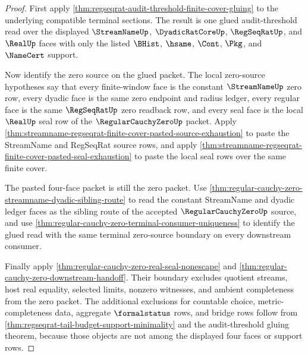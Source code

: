 \begin{proof}
First apply \autoref{thm:regseqrat-audit-threshold-finite-cover-gluing} to the underlying compatible terminal sections. The result is one glued audit-threshold read over the displayed $\StreamNameUp$, $\DyadicRatCoreUp$, $\RegSeqRatUp$, and $\RealUp$ faces with only the listed $\BHist$, $\hsame$, $\Cont$, $\Pkg$, and $\NameCert$ support.

Now identify the zero source on the glued packet. The local zero-source hypotheses say that every finite-window face is the constant $\StreamNameUp$ zero row, every dyadic face is the same zero endpoint and radius ledger, every regular face is the same $\RegSeqRatUp$ zero readback row, and every seal face is the local $\RealUp$ seal row of the $\RegularCauchyZeroUp$ packet. Apply \autoref{thm:streamname-regseqrat-finite-cover-pasted-source-exhaustion} to paste the StreamName and RegSeqRat source rows, and apply \autoref{thm:streamname-regseqrat-finite-cover-pasted-seal-exhaustion} to paste the local seal rows over the same finite cover.

The pasted four-face packet is still the zero packet. Use \autoref{thm:regular-cauchy-zero-streamname-dyadic-sibling-route} to read the constant StreamName and dyadic ledger faces as the sibling route of the accepted $\RegularCauchyZeroUp$ source, and use \autoref{thm:regular-cauchy-zero-terminal-consumer-uniqueness} to identify the glued read with the same terminal zero-source boundary on every downstream consumer.

Finally apply \autoref{thm:regular-cauchy-zero-real-seal-nonescape} and \autoref{thm:regular-cauchy-zero-downstream-handoff}. Their boundary excludes quotient streams, host real equality, selected limits, nonzero witnesses, and ambient completeness from the zero packet. The additional exclusions for countable choice, metric-completeness data, aggregate $\formalstatus$ rows, and bridge rows follow from \autoref{thm:regseqrat-tail-budget-support-minimality} and the audit-threshold gluing theorem, because those objects are not among the displayed four faces or support rows.
\end{proof}

